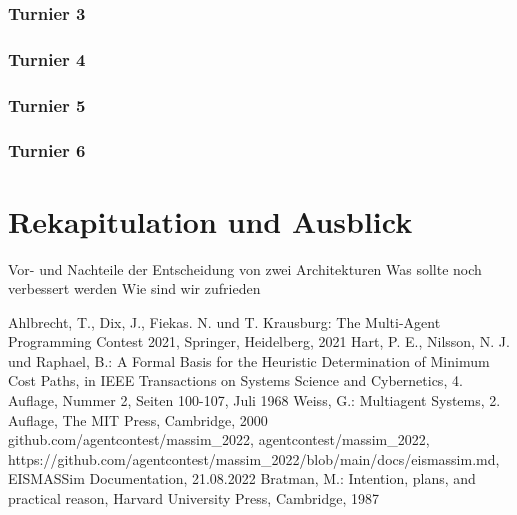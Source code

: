\documentclass[runningheads]{llncs}
\begin{document}
\subsubsection{Turnier 3}
\subsubsection{Turnier 4}
\subsubsection{Turnier 5}
\subsubsection{Turnier 6}

\section{Rekapitulation und Ausblick}
Vor- und Nachteile der Entscheidung von zwei Architekturen
Was sollte noch verbessert werden
Wie sind wir zufrieden


%
%
%
% 
% 
%
\begin{thebibliography}{8}
	Ahlbrecht, T., Dix, J., Fiekas. N. und T. Krausburg: The Multi-Agent Programming Contest 2021, Springer, Heidelberg, 2021
	Hart, P. E., Nilsson, N. J. und Raphael, B.: A Formal Basis for the Heuristic Determination of Minimum Cost Paths, in IEEE Transactions on Systems Science and Cybernetics, 4. Auflage, Nummer 2, Seiten 100-107, Juli 1968
	Weiss, G.: Multiagent Systems, 2. Auflage, The MIT Press, Cambridge, 2000
	github.com/agentcontest/massim\_2022, agentcontest/massim\_2022, \\ https://github.com/agentcontest/massim\_2022/blob/main/docs/eismassim.md, EISMASSim Documentation, 21.08.2022
	Bratman, M.: Intention, plans, and practical reason, Harvard University Press, Cambridge, 1987
\end{thebibliography}
\end{document}
